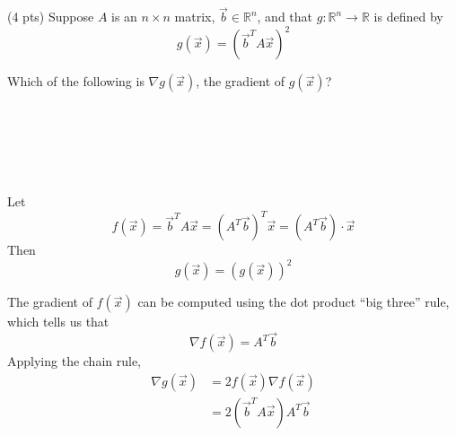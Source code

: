 \documentclass[11pt]{article}
\begin{document}
\begin{prob}[(10 pts)]
\vspace{1in}

\begin{subprob}(4 pts)
Suppose $A$ is an $n \times n$ matrix, $\vec b \in \mathbb{R}^n$, and that $g: \mathbb{R}^n \to \mathbb{R}$ is defined by
$$g(\vec x) = (\vec b^T A \vec x)^2$$

Which of the following is $\nabla g(\vec x)$, the gradient of $g(\vec x)$? \\

 \\
 \\
 \\
 \\
 \\

\begin{solution}
Let
\[
f(\vec x) = \vec b^T A \vec x = (A^T \vec b)^T \vec x = (A^T \vec b) \cdot \vec x
\]
Then
\[
g(\vec x) = (g(\vec x))^2
\]

The gradient of $f(\vec x)$ can be computed using the dot product ``big three'' rule, which tells us that
\[
\nabla f(\vec x) = A^T \vec b
\]
Applying the chain rule,
\begin{align*}
\nabla g(\vec x) &= 2 f(\vec x) \nabla f(\vec x) \\
&= 2 (\vec b^T A \vec x) A^T \vec b
\end{align*}
\end{solution}
\end{subprob}
\end{prob}

\newpage
\end{document}
